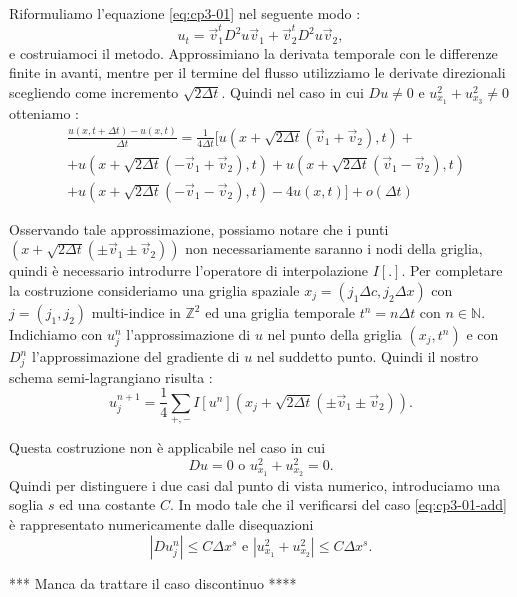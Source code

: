 Riformuliamo l'equazione \eqref{eq:cp3-01} nel seguente modo :
\begin{equation}
u_t=\vec{v}_1^tD^2u\vec{v}_1 + \vec{v}_2^tD^2u\vec{v}_2,
\end{equation}
e costruiamoci il metodo.
Approssimiano la derivata temporale con le differenze finite in avanti, mentre per il termine del flusso utilizziamo le derivate direzionali scegliendo come incremento $\sqrt{2\Delta t}$.
Quindi nel caso in cui $Du \ne 0$ e $u_{x_1}^2+u_{x_3}^2\ne 0$ otteniamo :
\[
\begin{split}
&\frac{u(x,t+\Delta t)-u(x,t)}{\Delta t} = \frac{1}{4\Delta t}\bigl[u(x+\sqrt{2\Delta t}(\vec{v}_1+\vec{v}_2),t) +\\
& +u(x+\sqrt{2\Delta t}(-\vec{v}_1+\vec{v}_2),t) + u(x+\sqrt{2\Delta t}(\vec{v}_1-\vec{v}_2),t) \\
& + u(x+\sqrt{2\Delta t}(-\vec{v}_1-\vec{v}_2),t) - 4u(x,t)\bigr] + o(\Delta t)
\end{split}
\]

Osservando tale approssimazione, possiamo notare che i punti  \\
$(x + \sqrt{2\Delta t}(\pm\vec{v}_1 \pm\vec{v}_2))$ non necessariamente saranno i nodi della griglia, quindi è necessario introdurre l'operatore di interpolazione $I[.]$.
Per completare la costruzione consideriamo una griglia spaziale $x_j=(j_1\Delta c,j_2\Delta x)$ con $j=(j_1,j_2)$ multi-indice in $\mathbb{Z}^2$ ed una griglia temporale $t^n=n\Delta t$ con $n\in\mathbb{N}$.
Indichiamo con $u_j^n$ l'approssimazione di $u$ nel punto della griglia $(x_j,t^n)$ e con $D_j^n$ l'approssimazione del gradiente di $u$ nel suddetto punto. Quindi il nostro schema semi-lagrangiano risulta :
\begin{equation}
\label{eq:cp3-02}
u_j^{n+1} = \frac{1}{4}\sum_{+,-}I[u^n](x_j+\sqrt{2\Delta t}(\pm\vec{v}_1\pm\vec{v}_2)).
\end{equation} 
\begin{osservazione}
Questa costruzione non è applicabile nel caso in cui 
\begin{equation}
\label{eq:cp3-01-add}
Du = 0 \text{ o } u_{x_1}^2+u_{x_2}^2 = 0. 
\end{equation}
Quindi per distinguere i due casi dal punto di vista numerico, introduciamo una soglia $s$ ed una costante $C$. In modo tale che il verificarsi del caso \eqref{eq:cp3-01-add} è rappresentato numericamente dalle disequazioni
\[
|Du_j^n|\le C\Delta x^s\text{ e }|u_{x_1}^2+u_{x_2}^2|\le C\Delta x^s.
\]
\end{osservazione}
*** Manca da trattare il caso discontinuo ****

